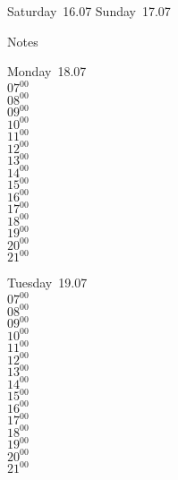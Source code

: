 \documentclass[11pt,a4paper]{book}\usepackage[]{graphicx}\usepackage[]{color}
\begin{document}
\begin{weekendbox}
  Saturday~16.07
  \tcblower
  Sunday~17.07
\end{weekendbox} %
\begin{notebox}
  Notes
\end{notebox}
\clearpage
\begin{headerbox}
\end{headerbox}
\begin{weekdaybox}
  Monday~18.07\\
  { 
  \vfill
  $07^{00}$\\
$08^{00}$\\
$09^{00}$\\
$10^{00}$\\
$11^{00}$\\
$12^{00}$\\
$13^{00}$\\
$14^{00}$\\
$15^{00}$\\
$16^{00}$\\
$17^{00}$\\
$18^{00}$\\
$19^{00}$\\
$20^{00}$\\
$21^{00}$\\
  }
\end{weekdaybox}
\begin{weekdaybox}
  Tuesday~19.07\\
  { 
  \vfill
  $07^{00}$\\
$08^{00}$\\
$09^{00}$\\
$10^{00}$\\
$11^{00}$\\
$12^{00}$\\
$13^{00}$\\
$14^{00}$\\
$15^{00}$\\
$16^{00}$\\
$17^{00}$\\
$18^{00}$\\
$19^{00}$\\
$20^{00}$\\
$21^{00}$\\
  }
\end{weekdaybox}
\end{document}
